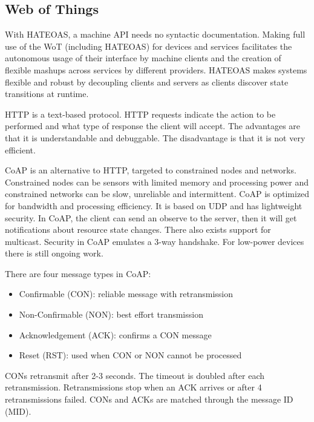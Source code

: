 \subsection{Web of Things}
\begin{mytitle} With HATEOAS, a machine API needs no syntactic documentation. Making full use of the WoT (including HATEOAS) for devices and services facilitates the autonomous usage of their interface by machine clients and the creation of flexible mashups across services by different providers. HATEOAS makes systems flexible and robust by decoupling clients and servers as clients discover state transitions at runtime.
\end{mytitle}
\begin{mytitle}[HTTP] HTTP is a text-based protocol. HTTP requests indicate the action to be performed and what type of response the client will accept. The advantages are that it is understandable and debuggable. The disadvantage is that it is not very efficient. 
\end{mytitle}
\begin{mytitle} CoAP is an alternative to HTTP, targeted to constrained nodes and networks. Constrained nodes can be sensors with limited memory and processing power and constrained networks can be slow, unreliable and intermittent. CoAP is optimized for bandwidth and processing efficiency. It is based on UDP and has lightweight security. In CoAP, the client can send an observe to the server, then it will get notifications about resource state changes. There also exists support for multicast. Security in CoAP emulates a 3-way handshake. For low-power devices there is still ongoing work.
    \begin{mysubtitle} There are four message types in CoAP:
    \begin{itemize}
        \item Confirmable (CON): reliable message with retransmission
        \item Non-Confirmable (NON): best effort transmission
        \item Acknowledgement (ACK): confirms a CON message
        \item Reset (RST): used when CON or NON cannot be processed
    \end{itemize}
    CONs retransmit after 2-3 seconds. The timeout is doubled after each retransmission. Retransmissions stop when an ACK arrives or after 4 retransmissions failed. CONs and ACKs are matched through the message ID (MID).
    \end{mysubtitle}
\end{mytitle}
